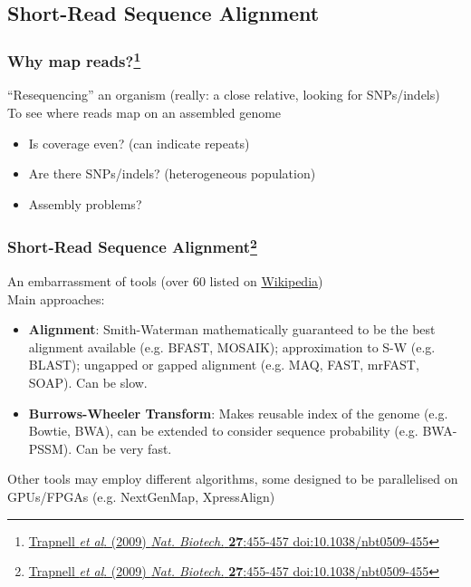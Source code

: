 
\subsection{Short-Read Sequence Alignment}

\begin{frame}
  \frametitle{Why map reads?\footnote{\tiny{\href{http://dx.doi.org/10.1038/nbt0509-455}{Trapnell \textit{et al}. (2009) \textit{Nat. Biotech.} \textbf{27}:455-457 doi:10.1038/nbt0509-455}}}}
  ``Resequencing'' an organism (really: a close relative, looking for SNPs/indels)\\
  To see where reads map on an assembled genome\\
  \begin{itemize}
    \item Is coverage even? (can indicate repeats)
    \item Are there SNPs/indels? (heterogeneous population)
    \item Assembly problems?
  \end{itemize}  
\end{frame}

\begin{frame}
  \frametitle{Short-Read Sequence Alignment\footnote{\tiny{\href{http://dx.doi.org/10.1038/nbt0509-455}{Trapnell \textit{et al}. (2009) \textit{Nat. Biotech.} \textbf{27}:455-457 doi:10.1038/nbt0509-455}}}}
  An embarrassment of tools (over 60 listed on \href{http://en.wikipedia.org/wiki/List_of_sequence_alignment_software}{Wikipedia})\\
  Main approaches:
  \begin{itemize}
    \item \textbf{Alignment}: Smith-Waterman mathematically guaranteed to be the best alignment available (e.g. BFAST, MOSAIK);  approximation to S-W (e.g. BLAST); ungapped or gapped alignment (e.g. MAQ, FAST, mrFAST, SOAP). Can be slow.
    \item \textbf{Burrows-Wheeler Transform}: Makes reusable index of the genome (e.g. Bowtie, BWA), can be extended to consider sequence probability (e.g. BWA-PSSM). Can be very fast.
  \end{itemize}
  Other tools may employ different algorithms, some designed to be parallelised on GPUs/FPGAs (e.g. NextGenMap, XpressAlign)
\end{frame}

